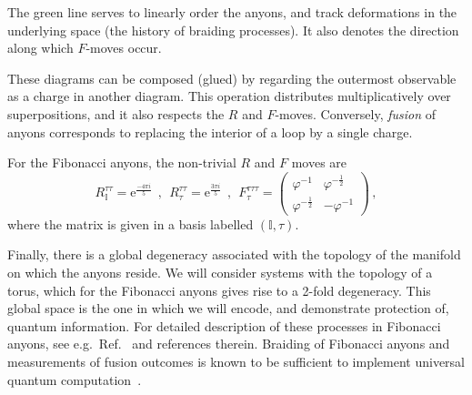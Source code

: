 \documentclass[aps, prl, letterpaper, twocolumn, superscriptaddress, notitlepage, 10pt]{revtex4}
\newcommand{\e}{\mathrm{e}}
\newcommand{\vac}{\mathbb{I}}
\newcommand{\dude}[1]{\textcolor{red}{#1}}
\begin{document}
The green line serves to linearly
order the anyons, and track
deformations in the underlying space 
(the history of braiding processes).
It also denotes the direction along
which $F$-moves occur.

These diagrams can be composed (glued)
by regarding the outermost observable
as a charge in another diagram.
This operation distributes multiplicatively
over superpositions, and it also respects the $R$ and $F$-moves.
Conversely, \emph{fusion} of anyons corresponds to 
replacing the interior of a loop by a single charge.



For the Fibonacci anyons, the non-trivial $R$ and $F$ moves are 
\begin{equation*}
	R_{\vac}^{\tau\tau} = \e^{\frac{-4\pi i}{5}} 
	\ \ , \ \
	R_\tau^{\tau\tau}= \e^{\frac{3\pi i}{5}} 
	\ \ , \ \
	F_{\tau}^{\tau\tau\tau} = \begin{pmatrix}\varphi^{-1}&\varphi^{-\frac{1}{2}}\\\varphi^{-\frac{1}{2}}&-\varphi^{-1}\end{pmatrix} \,,
\end{equation*}
where the matrix is given in a basis labelled $(\vac,\tau)$.

Finally, there is a global degeneracy associated with the topology of the 
manifold on which the anyons reside. We will consider systems with the topology of a torus, 
which for the Fibonacci anyons gives rise to a 2-fold degeneracy.
This global space is the one in which we will encode, and demonstrate protection of, quantum 
information. 
For detailed description of these 
processes in Fibonacci anyons, see e.g.~Ref.~\cite{Nayak2008} and references therein. 
Braiding of Fibonacci anyons and measurements of fusion outcomes is known to be 
sufficient to implement universal quantum computation~\cite{Freedman2002, Nayak2008}.
\end{document}
